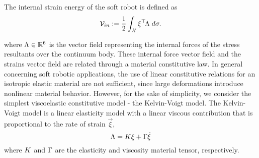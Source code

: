 The internal strain energy of the soft robot is defined as
\begin{equation}
\mathcal{V}_{in} := \frac{1}{2}\int_\mathcal{X} {\xi}^\top\! {\Lambda} \;d\sigma.
\end{equation}

where ${\Lambda} \in \mathbb{R}^6$ is the vector field representing the internal forces of the stress resultants over the continuum body. These internal force vector field and the strains vector field are related through a material constitutive law. In general concerning soft robotic applications, the use of linear constitutive relations for an isotropic elastic material are not sufficient, since large deformations introduce nonlinear material behavior. However, for the sake of simplicity, we consider the simplest viscoelastic constitutive model - the Kelvin-Voigt model. The Kelvin-Voigt model is a linear elasticity model with a linear viscous contribution that is proportional to the rate of strain $\vec{\xi}$, 
\begin{equation}
{\Lambda} = {K}{\xi} + {\Gamma} \dot{{\xi}}
\end{equation}
where ${K}$ and ${\Gamma}$ are the elasticity and viscosity material tensor, respectively.


